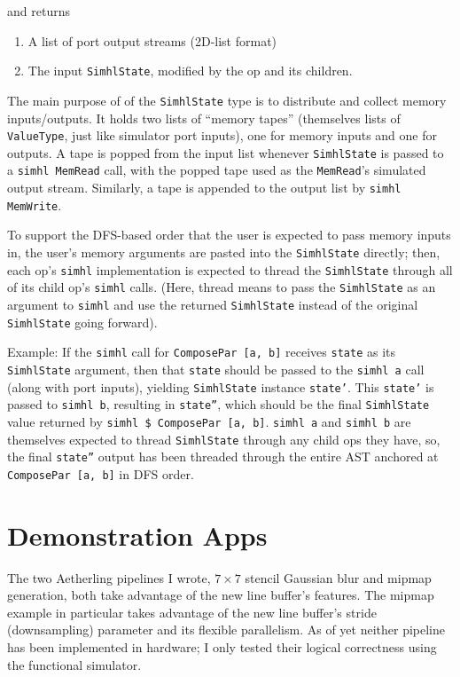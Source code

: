 \documentclass[12pt]{article}
\begin{document}
and returns

\begin{enumerate}
\item A list of port output streams (2D-list format)
\item The input \texttt{SimhlState}, modified by the op and its children.
\end{enumerate}

The main purpose of of the \texttt{SimhlState} type is to distribute
and collect memory inputs/outputs. It holds two lists of ``memory
tapes'' (themselves lists of \texttt{ValueType}, just like simulator
port inputs), one for memory inputs and one for outputs. A tape is
popped from the input list whenever \texttt{SimhlState} is passed to a
\texttt{simhl MemRead} call, with the popped tape used as the
\texttt{MemRead}'s simulated output stream. Similarly, a tape is appended to
the output list by \texttt{simhl MemWrite}.

To support the DFS-based order that the user is expected to pass memory
inputs in, the user's memory arguments are pasted into the
\texttt{SimhlState} directly; then, each op's \texttt{simhl}
implementation is expected to thread the \texttt{SimhlState}
through all of its child op's \texttt{simhl} calls. (Here,
thread means to pass the \texttt{SimhlState} as an argument to
\texttt{simhl} and use the returned \texttt{SimhlState} instead
of the original \texttt{SimhlState} going forward).

Example: If the \texttt{simhl} call for \texttt{ComposePar [a, b]}
receives \texttt{state} as its \texttt{SimhlState} argument, then that
\texttt{state} should be passed to the \texttt{simhl a} call (along
with port inputs), yielding \texttt{SimhlState} instance \texttt{state'}.
This \texttt{state'} is passed to \texttt{simhl b}, resulting in
\texttt{state''}, which should be the final \texttt{SimhlState} value
returned by \texttt{simhl \$ ComposePar [a, b]}. \texttt{simhl a} and
\texttt{simhl b} are themselves expected to thread \texttt{SimhlState}
through any child ops they have, so, the final \texttt{state''} output
has been threaded through the entire AST anchored at
\texttt{ComposePar [a, b]} in DFS order.

\section{Demonstration Apps}

The two Aetherling pipelines I wrote, $7 \times 7$ stencil Gaussian
blur and mipmap generation, both take advantage of the new line
buffer's features. The mipmap example in particular takes advantage of
the new line buffer's stride (downsampling) parameter and its flexible
parallelism. As of yet neither pipeline has been implemented in
hardware; I only tested their logical correctness using the functional
simulator.
\end{document}
